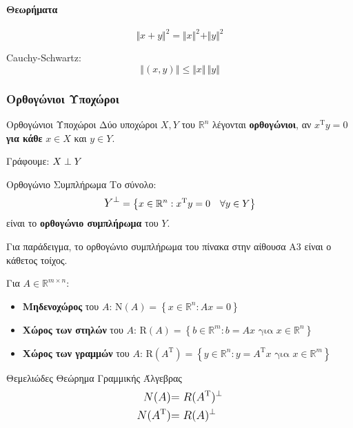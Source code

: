 \documentclass[11pt,a4paper,notitlepage,fleqn]{article}
\begin{document}
	\paragraph{Θεωρήματα}
	\[
	\Vert x+y\Vert ^2 = \Vert x\Vert ^2 + \Vert y\Vert ^2
	\]
	
	Cauchy-Schwartz:
	\[
	\left\Vert(x,y)\right\Vert \leq \Vert x\Vert \,\Vert y\Vert 
	\]
	
	\subsubsection{Ορθογώνιοι Υποχώροι}
	\begin{defn}{Ορθογώνιοι Υποχώροι}{}
		Δύο υποχώροι \( X,Y \) του  \( \mathbb R^n \) λέγονται
		\textbf{ορθογώνιοι}, αν \( x^{\mathrm T}y = 0 \) \textbf{για
		κάθε} \( x \in X \) και \( y \in Y \).
	
	    Γράφουμε: \( \mathlarger{X \perp Y} \)
	\end{defn}
	\begin{defn}{Ορθογώνιο Συμπλήρωμα}{}
		Το σύνολο:
		\[
		\mathlarger{
			Y^\perp
			} = \left\lbrace 
			x \in \mathbb R^n : x^{\mathrm T}y = 0 \quad
			\forall y \in Y
			 \right\rbrace
		\]
		είναι το \textbf{ορθογώνιο συμπλήρωμα} του \( Y \).
		
		Για παράδειγμα, το ορθογώνιο συμπλήρωμα του πίνακα στην αίθουσα
		Α3 είναι ο κάθετος τοίχος.
	\end{defn}
	\begin{defn}{}{}
		Για \( A \in \mathbb R^{m \times n} \):
		\begin{itemize}
			\item \textbf{Μηδενοχώρος} του \( A \):
			\( \mathrm N(A) = \left\lbrace x\in\mathbb R^n: Ax=0
			 \right\rbrace \)
			\item \textbf{Χώρος των στηλών} του \( A \):
			\( \mathrm R(A)  = \left\lbrace
			b \in \mathbb R^m: b = Ax \text{ για }
			x \in \mathbb R^n \right\rbrace
			\)
			\item \textbf{Χώρος των γραμμών} του \( A \):
			\( \mathrm R(A^{\mathrm T}) = \left\lbrace 
			y \in \mathbb R^n: y = A^{\mathrm T}x \text{ για }
			x \in \mathbb R^m
			 \right\rbrace \)
		\end{itemize}
	\end{defn}
	\begin{theorem}{Θεμελιώδες Θεώρημα Γραμμικής Άλγεβρας}{}
		\begin{align*}
			\mathlarger{N(A)} &\mathlarger{= R(A^{\mathrm T})^\perp}
			\\
			\mathlarger{N(A^{\mathrm T})} &\mathlarger{= R(A)^\perp}
		\end{align*}
	\end{theorem}
\end{document}
